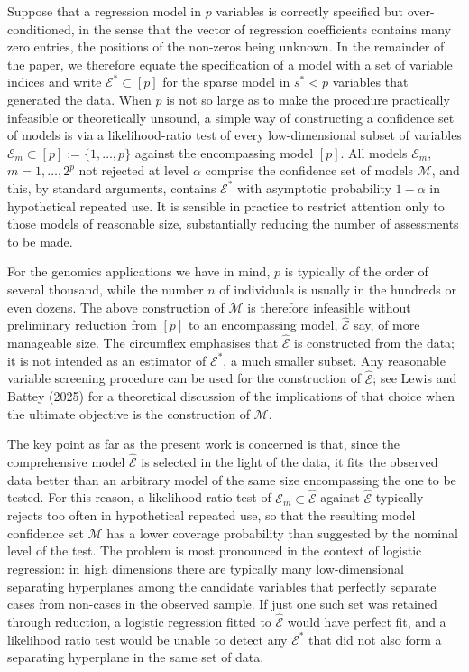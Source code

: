 \documentclass[10pt, reqno]{amsart}
\numberwithin{equation}{section}
\begin{document}
Suppose that a regression model in $p$ variables is correctly specified but over-conditioned, in the sense that the vector of regression coefficients contains many zero entries, the positions of the non-zeros being unknown. In the remainder of the paper, we therefore equate the specification of a model with a set of variable indices and write  $\mathcal{E}^*\subset [p]$ for the sparse model in $s^*<p$ variables that generated the data. When $p$ is not so large as to make the procedure practically infeasible or theoretically unsound, a simple way of constructing a confidence set of models is via a likelihood-ratio test of every low-dimensional subset of variables $\mathcal{E}_m\subset [p]:=\{1,\ldots,p\}$ against the encompassing model $[p]$. All models $\mathcal{E}_m$, $m=1,\ldots,2^p$ not rejected at level $\alpha$ comprise the confidence set of models $\mathcal{M}$, and this, by standard arguments, contains $\mathcal{E}^*$ with asymptotic probability $1-\alpha$ in hypothetical repeated use. It is sensible in practice to restrict attention only to those models of reasonable size, substantially reducing the number of assessments to be made. 

For the genomics applications we have in mind, $p$ is typically of the order of several thousand, while the number $n$ of individuals is usually in the hundreds or even dozens. The above  construction of $\mathcal{M}$ is therefore infeasible without preliminary reduction from $[p]$ to an encompassing model, $\hat{\mathcal{E}}$ say, of more manageable size. The circumflex emphasises that $\hat{\mathcal{E}}$ is constructed from the data; it is not intended as an estimator of $\mathcal{E}^*$, a much smaller subset. Any reasonable variable screening procedure can be used for the construction of $\hat{\mathcal{E}}$; see Lewis and Battey (2025) for a theoretical discussion of the implications of that choice when the ultimate objective is the construction of $\mathcal{M}$.

The key point as far as the present work is concerned is that, since the comprehensive model $\hat{\mathcal{E}}$ is selected in the light of the data, it fits the observed data better than an arbitrary model of the same size encompassing the one to be tested. For this reason, a likelihood-ratio test of $\mathcal{E}_m \subset \hat{\mathcal{E}}$ against $\hat{\mathcal{E}}$ typically rejects too often in hypothetical repeated use, so that the resulting model confidence set $\mathcal{M}$ has a lower coverage probability than suggested by the nominal level of the test. The problem is most pronounced in the context of logistic regression: in high dimensions there are typically many low-dimensional separating hyperplanes among the candidate variables that perfectly separate cases from non-cases in the observed sample. If just one such set was retained through reduction, a logistic regression fitted to $\hat{\mathcal{E}}$ would have perfect fit, and a likelihood ratio test would be unable to detect any $\mathcal{E}^*$ that did not also form a separating hyperplane in the same set of data.
\end{document}
